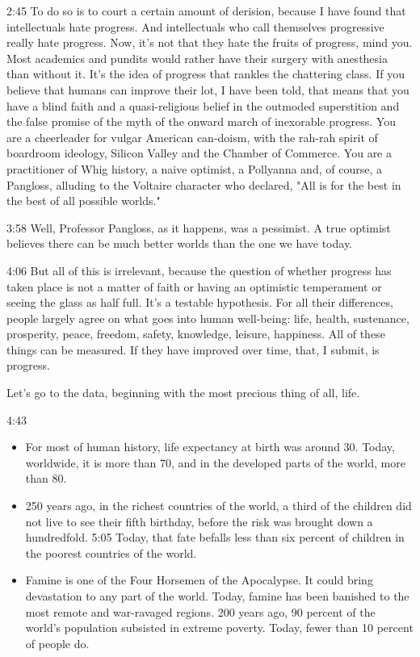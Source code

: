 \documentclass[10pt,titlepage]{book}
\begin{document}
{2:45
To do so is to court a certain amount of derision,
because I have found that intellectuals hate progress.
And intellectuals who call themselves progressive really hate progress.
Now, it's not that they hate the fruits of progress, mind you.
Most academics and pundits
would rather have their surgery with anesthesia than without it.
It's the idea of progress that rankles the chattering class.
If you believe that humans can improve their lot, I have been told,
that means that you have a blind faith
and a quasi-religious belief in the outmoded superstition
and the false promise of the myth of the onward march
of inexorable progress.
You are a cheerleader for vulgar American can-doism,
with the rah-rah spirit of boardroom ideology,
Silicon Valley and the Chamber of Commerce.
You are a practitioner of Whig history,
a naive optimist, a Pollyanna and, of course, a Pangloss,
alluding to the Voltaire character who declared,
"All is for the best in the best of all possible worlds."

3:58
Well, Professor Pangloss, as it happens, was a pessimist.
A true optimist believes there can be much better worlds
than the one we have today.

4:06
But all of this is irrelevant,
because the question of whether progress has taken place
is not a matter of faith
or having an optimistic temperament or seeing the glass as half full.
It's a testable hypothesis.
For all their differences,
people largely agree on what goes into human well-being:
life, health, sustenance, prosperity, peace, freedom, safety, knowledge,
leisure, happiness.
All of these things can be measured.
If they have improved over time, that, I submit, is progress.

Let's go to the data,
beginning with the most precious thing of all, life.

4:43

\begin{itemize}
\item For most of human history, life expectancy at birth was around 30.
Today, worldwide, it is more than 70,
and in the developed parts of the world,
more than 80.
\item 250 years ago, in the richest countries of the world,
a third of the children did not live to see their fifth birthday,
before the risk was brought down a hundredfold.
5:05
Today, that fate befalls less than six percent of children
in the poorest countries of the world.
\item Famine is one of the Four Horsemen of the Apocalypse.
It could bring devastation to any part of the world.
Today, famine has been banished
to the most remote and war-ravaged regions.
200 years ago, 90 percent of the world's population
subsisted in extreme poverty.
Today, fewer than 10 percent of people do.
\end{itemize}

}
\end{document}

